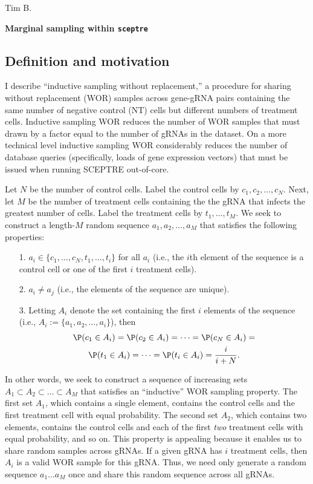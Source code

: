 \documentclass[12pt]{article}
\begin{document}
\noindent
Tim B.

\begin{center}
\textbf{Marginal sampling within \texttt{sceptre}}
\end{center}

\subsection*{Definition and motivation}

I describe ``inductive sampling without replacement,'' a procedure for sharing without replacement (WOR) samples across gene-gRNA pairs containing the same number of negative control (NT) cells but different numbers of treatment cells. Inductive sampling WOR reduces the number of WOR samples that must drawn by a factor equal to the number of gRNAs in the dataset. On a more technical level inductive sampling WOR considerably reduces the number of database queries (specifically, loads of gene expression vectors) that must be issued when running SCEPTRE out-of-core.

Let $N$ be the number of control cells. Label the control cells by $c_1, c_2, \dots, c_N$. Next, let $M$ be the number of treatment cells containing the the gRNA that infects the greatest number of cells. Label the treatment cells by $t_1, \dots, t_M$. We seek to construct a length-$M$ random sequence $a_1, a_2, \dots, a_M$ that satisfies the following properties:
\begin{itemize}
\item[1.] $a_i \in \{ c_1, \dots, c_N, t_1, \dots, t_i \} $ for all $a_i$ (i.e., the $i$th element of the sequence is a control cell or one of the first $i$ treatment cells).
\item[2.] $a_i \neq a_j$ (i.e., the elements of the sequence are unique).
\item[3.] Letting $A_i$ denote the set containing the first $i$ elements of the sequence (i.e., $A_i := \{ a_1, a_2, \dots, a_i \}$), then
\begin{multline*}
\P(c_1 \in A_i) = \P(c_2 \in A_i) = \dots = \P(c_N \in A_i) = \\ \P(t_1 \in A_i) = \dots = \P(t_i \in A_i) = \frac{i}{i + N}.
\end{multline*}
\end{itemize}

In other words, we seek to construct a sequence of increasing sets $A_1 \subset A_2 \subset \dots \subset A_M$ that satisfies an ``inductive'' WOR sampling property. The first set $A_1$, which contains a single element, contains the control cells and the first treatment cell with equal probability. The second set $A_2$, which contains two elements, contains the control cells and each of the first \textit{two} treatment cells with equal probability, and so on. This property is appealing because it enables us to share random samples across gRNAs. If a given gRNA has $i$ treatment cells, then $A_i$ is a valid WOR sample for this gRNA. Thus, we need only generate a random sequence $a_1 \dots a_M$ once and share this random sequence across all gRNAs.
\end{document}
